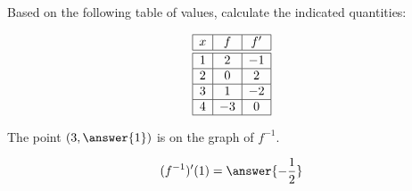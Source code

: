 \documentclass{ximera}
\author{Steven Gubkin}
\begin{document}
\begin{exercise}

Based on the following table of values, calculate the indicated quantities:

 \[
  \begin{array}{|c|c|c|}\hline
    x & f  & f' \\ \hline \hline
    1 & 2 & -1 \\ \hline
    2 & 0  & 2  \\ \hline
    3 & 1  & -2 \\ \hline
    4 & -3 & 0  \\ \hline
  \end{array}
  \]

The point $(3, \answer{1})$ is on the graph of $f^{-1}$.

\[
(f^{-1})'(1) = \answer{-\frac{1}{2}}
\]

\end{exercise}
\end{document}
